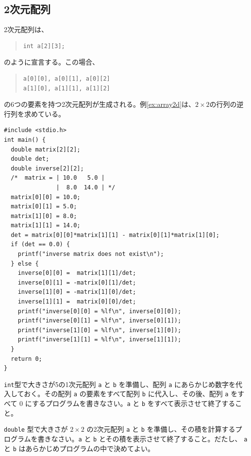 \subsection{2次元配列}
2次元配列は、
\begin{quote}
\begin{verbatim}
int a[2][3];
\end{verbatim}
\end{quote}
のように宣言する。この場合、
\begin{quote}
\begin{verbatim}
a[0][0], a[0][1], a[0][2]
a[1][0], a[1][1], a[1][2]
\end{verbatim}
\end{quote}
の6つの要素を持つ2次元配列が生成される。例\ref{ex:array2d}は、$2 \times 2$の行列の逆行列を求めている。
\begin{reidai}\label{ex:array2d}
\begin{verbatim}
#include <stdio.h>
int main() {
  double matrix[2][2];
  double det;
  double inverse[2][2];
  /*  matrix = | 10.0   5.0 |
               |  8.0  14.0 | */
  matrix[0][0] = 10.0;
  matrix[0][1] = 5.0;
  matrix[1][0] = 8.0;
  matrix[1][1] = 14.0;
  det = matrix[0][0]*matrix[1][1] - matrix[0][1]*matrix[1][0];
  if (det == 0.0) {
    printf("inverse matrix does not exist\n");
  } else {
    inverse[0][0] =  matrix[1][1]/det;
    inverse[0][1] = -matrix[0][1]/det;
    inverse[1][0] = -matrix[1][0]/det;
    inverse[1][1] =  matrix[0][0]/det;
    printf("inverse[0][0] = %lf\n", inverse[0][0]);
    printf("inverse[0][1] = %lf\n", inverse[0][1]);
    printf("inverse[1][0] = %lf\n", inverse[1][0]);
    printf("inverse[1][1] = %lf\n", inverse[1][1]);
  }
  return 0;
}
\end{verbatim}
\end{reidai}

\begin{renshuu}\label{prob:3-1}
\verb|int|型で大きさが5の1次元配列 \verb|a| と \verb|b| を準備し、配列 \verb|a| にあらかじめ数字を代入しておく。その配列 \verb|a| の要素をすべて配列 \verb|b| に代入し、その後、配列 \verb|a| をすべて 0 にするプログラムを書きなさい。\verb|a| と \verb|b| をすべて表示させて終了すること。
\end{renshuu}

\begin{renshuu}\label{prob:3-2}
\verb|double| 型で大きさが $2\times2$ の2次元配列 \verb|a| と \verb|b| を準備し、その積を計算するプログラムを書きなさい。\verb|a| と \verb|b| とその積を表示させて終了すること。だたし、 \verb|a| と \verb|b| はあらかじめプログラムの中で決めてよい。
\end{renshuu}

